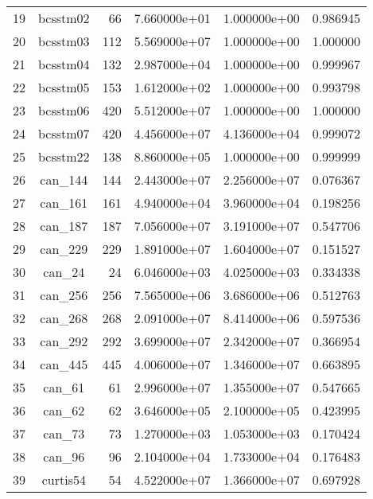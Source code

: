 \documentclass[8pt]{report}
\begin{document}
\begin{table*}
\begin{tabular}{|l|c|r|r|r|r|}
19  &                 bcsstm02 &    66 &  7.660000e+01 &  1.000000e+00 &  0.986945 \\
20  &                 bcsstm03 &   112 &  5.569000e+07 &  1.000000e+00 &  1.000000 \\
21  &                 bcsstm04 &   132 &  2.987000e+04 &  1.000000e+00 &  0.999967 \\
22  &                 bcsstm05 &   153 &  1.612000e+02 &  1.000000e+00 &  0.993798 \\
23  &                 bcsstm06 &   420 &  5.512000e+07 &  1.000000e+00 &  1.000000 \\
24  &                 bcsstm07 &   420 &  4.456000e+07 &  4.136000e+04 &  0.999072 \\
25  &                 bcsstm22 &   138 &  8.860000e+05 &  1.000000e+00 &  0.999999 \\
26  &                  can\_144 &   144 &  2.443000e+07 &  2.256000e+07 &  0.076367 \\
27  &                  can\_161 &   161 &  4.940000e+04 &  3.960000e+04 &  0.198256 \\
28  &                  can\_187 &   187 &  7.056000e+07 &  3.191000e+07 &  0.547706 \\
29  &                  can\_229 &   229 &  1.891000e+07 &  1.604000e+07 &  0.151527 \\
30  &                   can\_24 &    24 &  6.046000e+03 &  4.025000e+03 &  0.334338 \\
31  &                  can\_256 &   256 &  7.565000e+06 &  3.686000e+06 &  0.512763 \\
32  &                  can\_268 &   268 &  2.091000e+07 &  8.414000e+06 &  0.597536 \\
33  &                  can\_292 &   292 &  3.699000e+07 &  2.342000e+07 &  0.366954 \\
34  &                  can\_445 &   445 &  4.006000e+07 &  1.346000e+07 &  0.663895 \\
35  &                   can\_61 &    61 &  2.996000e+07 &  1.355000e+07 &  0.547665 \\
36  &                   can\_62 &    62 &  3.646000e+05 &  2.100000e+05 &  0.423995 \\
37  &                   can\_73 &    73 &  1.270000e+03 &  1.053000e+03 &  0.170424 \\
38  &                   can\_96 &    96 &  2.104000e+04 &  1.733000e+04 &  0.176483 \\
39  &                 curtis54 &    54 &  4.522000e+07 &  1.366000e+07 &  0.697928 \\

\end{tabular}
\end{table*}
\end{document}
